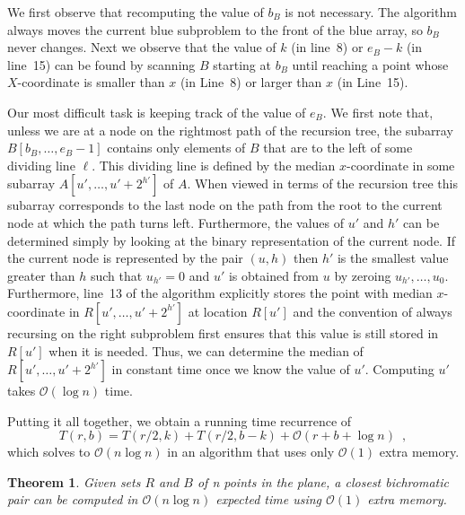 \documentclass{elsart}
\newcommand{\Oh}[1]{\ensuremath{\mathcal{O}(#1)}}
\newtheorem{theorem}{Theorem}
\begin{document}
We first observe that recomputing the value of $b_B$ is not necessary.
The algorithm always moves the current blue subproblem to the front of
the blue array, so $b_B$ never changes.  Next we observe that the
value of $k$ (in line~8) or $e_B-k$ (in line~15) can be found by
scanning $B$ starting at $b_B$ until reaching a point whose
$X$-coordinate is smaller than $x$ (in Line~8) or larger than $x$ (in
Line~15). 

Our most difficult task is keeping track of the value of $e_B$.  We
first note that, unless we are at a node on the rightmost path of the
recursion tree, the subarray $B[b_B,\ldots,e_B-1]$ contains only
elements of $B$ that are to the left of some dividing line $\ell$.
This dividing line is defined by the median $x$-coordinate in some
subarray $A[u',\ldots,u'+2^{h'}]$ of $A$.  When viewed in terms of the
recursion tree this subarray corresponds to the last node on the path
from the root to the current node at which the path turns left.
Furthermore, the values of $u'$ and $h'$ can be determined simply by
looking at the binary representation of the current node. If the
current node is represented by the pair $(u,h)$ then $h'$ is the
smallest value greater than $h$ such that $u_{h'}=0$ and $u'$ is obtained
from $u$ by zeroing $u_{h'},\ldots,u_0$.  Furthermore, line~13 of the
algorithm explicitly stores the point with median $x$-coordinate in
$R[u',\ldots,u'+2^{h'}]$ at location $R[u']$ and the convention of
always recursing on the right subproblem first ensures that this value
is still stored in $R[u']$ when it is needed.   Thus, we can determine
the median of $R[u',\ldots,u'+2^{h'}]$ in constant time once we know
the value of $u'$. Computing $u'$ takes \Oh{\log n} time.  

Putting it all together, we obtain a running time recurrence of
\[
    T(r,b) = T(r/2,k) + T(r/2,b-k) + \Oh{r+b+\log n} \enspace ,
\]
which solves to $\Oh{n\log n}$ in an algorithm that uses only \Oh{1}
extra memory.


\begin{theorem}
  Given sets $R$ and $B$ of n points in the plane, a closest
  bichromatic pair can be computed in \Oh{n \log n} expected time
  using \Oh{1} extra memory.
\end{theorem}
\end{document}
